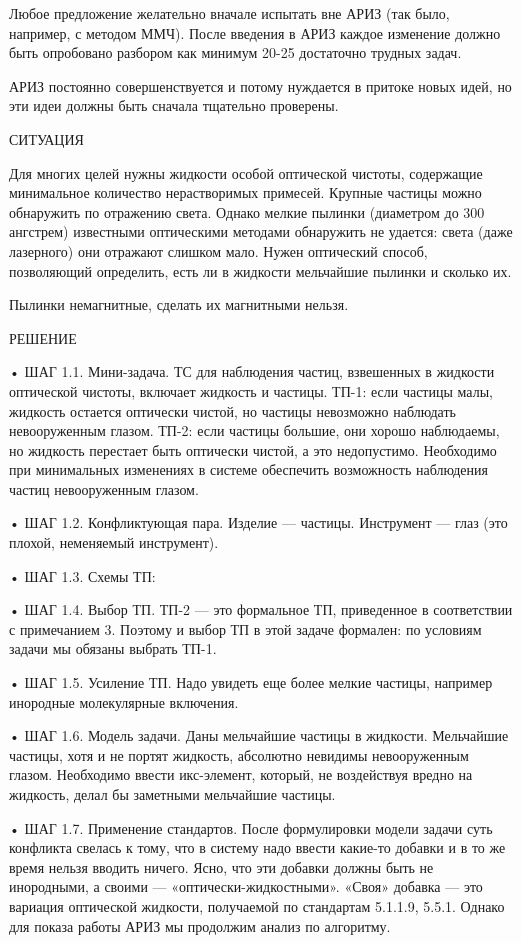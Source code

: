 Любое  предложение желательно  вначале  испытать вне  АРИЗ (так  было,
например,  с методом  ММЧ).  После введения  в  АРИЗ каждое  изменение
должно быть  опробовано разбором как минимум  20-25 достаточно трудных
задач.

АРИЗ  постоянно совершенствуется  и потому  нуждается в  притоке новых
идей, но эти идеи должны быть сначала тщательно проверены.


СИТУАЦИЯ

Для многих целей нужны  жидкости особой оптической чистоты, содержащие
минимальное количество  нерастворимых примесей. Крупные  частицы можно
обнаружить по отражению света. Однако мелкие пылинки (диаметром до 300
ангстрем) известными оптическими методами обнаружить не удается: света
(даже лазерного)  они отражают слишком мало.  Нужен оптический способ,
позволяющий  определить,  есть  ли  в жидкости  мельчайшие  пылинки  и
сколько их.

Пылинки немагнитные, сделать их магнитными нельзя.

РЕШЕНИЕ

•  ШАГ  1.1.  Мини-задача.  ТС для  наблюдения  частиц,  взвешенных  в
жидкости  оптической  чистоты,  включает  жидкость  и  частицы.  ТП-1:
если  частицы малы,  жидкость  остается оптически  чистой, но  частицы
невозможно наблюдать невооруженным глазом. ТП-2: если частицы большие,
они хорошо наблюдаемы, но жидкость  перестает быть оптически чистой, а
это  недопустимо.  Необходимо  при минимальных  изменениях  в  системе
обеспечить возможность наблюдения частиц невооруженным глазом.

• ШАГ  1.2. Конфликтующая пара.  Изделие — частицы. Инструмент  — глаз
(это плохой, неменяемый инструмент).

• ШАГ 1.3. Схемы ТП:

• ШАГ  1.4.  Выбор  ТП.  ТП-2 —  это  формальное  ТП,  приведенное  в
соответствии  с  примечанием 3.  Поэтому  и  выбор  ТП в  этой  задаче
формален: по условиям задачи мы обязаны выбрать ТП-1.

• ШАГ  1.5. Усиление  ТП.  Надо  увидеть  еще более  мелкие  частицы,
например инородные молекулярные включения.

•  ШАГ  1.6.  Модель  задачи.  Даны  мельчайшие  частицы  в  жидкости.
Мельчайшие  частицы, хотя  и  не портят  жидкость, абсолютно  невидимы
невооруженным  глазом.  Необходимо  ввести  икс-элемент,  который,  не
воздействуя вредно на жидкость, делал бы заметными мельчайшие частицы.

•  ШАГ 1.7.  Применение стандартов.  После формулировки  модели задачи
суть  конфликта свелась  к тому,  что в  систему надо  ввести какие-то
добавки и в  то же время нельзя вводить ничего.  Ясно, что эти добавки
должны быть не инородными,  а своими — «оптически-жидкостными». «Своя»
добавка —  это вариация оптической жидкости,  получаемой по стандартам
5.1.1.9, 5.5.1. Однако  для показа работы АРИЗ мы  продолжим анализ по
алгоритму.

